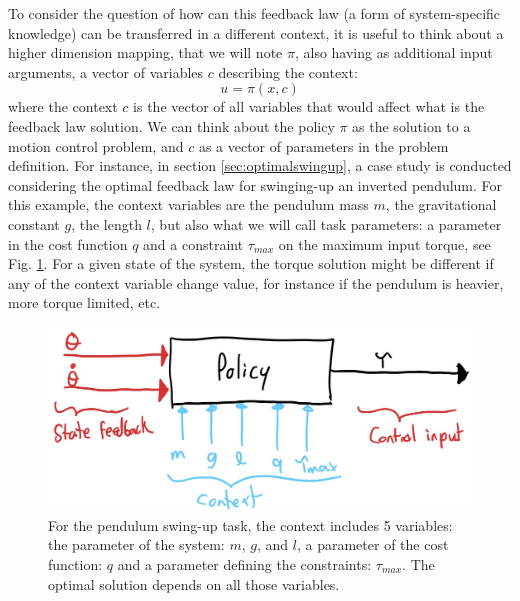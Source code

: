 To consider the question of how can this feedback law (a form of system-specific knowledge) can be transferred in a different context, it is useful to think about a higher dimension mapping, that we will note $\pi$, also having as additional input arguments, a vector of variables $c$ describing the context:
\begin{equation}
u
=
\pi \left(
x,
c
\right)
\end{equation}
where the context $c$ is the vector of all variables that would affect what is the feedback law solution. We can think about the policy $\pi$ as the solution to a motion control problem, and $c$ as a vector of parameters in the problem definition. For instance, in section \ref{sec:optimalswingup}, a case study is conducted considering the optimal feedback law for swinging-up an inverted pendulum. For this example, the context variables are the pendulum mass $m$, the gravitational constant $g$, the length $l$, but also what we will call task parameters: a parameter in the cost function $q$ and a constraint $\tau_{max}$ on the maximum input torque, see Fig. \ref{fig:policy_context}. For a given state of the system, the torque solution might be different if any of the context variable change value, for instance if the pendulum is heavier, more torque limited, etc.
\begin{figure}[h]
\vspace{-5pt}
\begin{center}
\includegraphics[width=0.95\linewidth]{fig/policy_context.jpg}
\caption{For the pendulum swing-up task, the context includes 5 variables: the parameter of the system: $m$, $g$, and $l$, a parameter of the cost function: $q$ and a parameter defining the constraints: $\tau_{max}$. The optimal solution depends on all those variables.
}\label{fig:policy_context}
\end{center}
\vspace{-5pt}
\end{figure}

